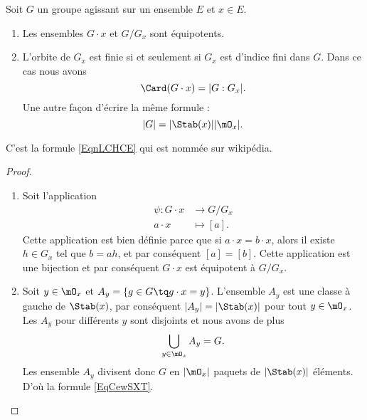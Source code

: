 \begin{proposition}     \label{Propszymlr}
    Soit \( G\) un groupe agissant sur un ensemble \( E\) et \( x\in E\).
    \begin{enumerate}
        \item
            Les ensembles \( G\cdot x\) et \( G/G_x\) sont équipotents.
        \item
            L'orbite de \( G_x\) est finie si et seulement si \( G_x\) est d'indice fini dans \( G\). Dans ce cas nous avons 
            \begin{equation}        \label{EqnLCHCE}
                \Card(G\cdot x)=| G:G_x |.
            \end{equation}
            Une autre façon d'écrire la même formule :
            \begin{equation}        \label{EqCewSXT}
                | G |=| \Stab(x) | |\mO_x |.
            \end{equation}
    \end{enumerate}
\end{proposition}
C'est la formule \eqref{EqnLCHCE} qui est nommée  sur wikipédia.

\begin{proof}
    \begin{enumerate}
        \item
    Soit l'application
    \begin{equation}
        \begin{aligned}
            \psi\colon G\cdot x&\to G/G_x \\
            a\cdot x&\mapsto [a]. 
        \end{aligned}
    \end{equation}
    Cette application est bien définie parce que si \( a\cdot x=b\cdot x\), alors il existe \( h\in G_x\) tel que \( b=ah\), et par conséquent \( [a]=[b]\). Cette application est une bijection et par conséquent \( G\cdot x\) est équipotent à \( G/G_x\).
    \item
        Soit \( y\in \mO_x\) et \( A_y=\{ g\in G\tq g\cdot x=y \}\). L'ensemble \( A_y\) est une classe à gauche de \( \Stab(x)\), par conséquent \( | A_y |=|\Stab(x)|\) pour tout \( y\in\mO_x\). Les \( A_y\) pour différents \( y\) sont disjoints et nous avons de plus
        \begin{equation}
            \bigcup_{y\in\mO_x}A_y=G.
        \end{equation}
        Les ensemble \( A_y\) divisent donc \( G\) en \( | \mO_x |\) paquets de \( | \Stab(x) |\) éléments. D'où la formule \eqref{EqCewSXT}.
        
    \end{enumerate}
\end{proof}

